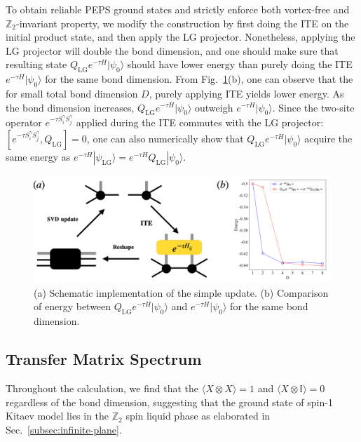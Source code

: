 \documentclass{ntuthesis}
\begin{document}
To obtain reliable PEPS ground states and strictly enforce both vortex-free and $\mathbb{Z}_2$-invariant property, we modify the construction by first doing the ITE on the initial product state, and then apply the LG projector. Nonetheless, applying the LG projector will double the bond dimension, and one should make sure that resulting state $Q_{\text{LG}}e^{-\tau H}|\psi_0 \rangle$ should have lower energy than purely doing the ITE $e^{-\tau H}|\psi_0 \rangle$ for the same bond dimension. From Fig.~\ref{fig:ITE_energy}(b), one can observe that the for small total bond dimension $D$, purely applying ITE yields lower energy. As the bond dimension increases, $Q_{\text{LG}}e^{-\tau H}|\psi_0 \rangle$ outweigh $e^{-\tau H}|\psi_0 \rangle$. Since the two-site operator $e^{-\tau S_i^\gamma S_j^\gamma}$ applied during the ITE commutes with the LG projector: $[e^{-\tau S_i^\gamma S_j^\gamma}, Q_{\text{LG}}] = 0$, one can also numerically show that $Q_{\text{LG}}e^{-\tau H}|\psi_0 \rangle$ acquire the same energy as $e^{-\tau H}|\psi_\text{LG} \rangle = e^{-\tau H}Q_{\text{LG}}|\psi_0 \rangle$.

\begin{figure}[h]
 \centering
\includegraphics[width=\linewidth]{ITE_energy}
\caption{(a) Schematic implementation of the simple update. (b) Comparison of energy between $Q_{\text{LG}}e^{-\tau H}|\psi_0 \rangle$ and $e^{-\tau H}|\psi_0 \rangle$ for the same bond dimension.}
\label{fig:ITE_energy}
\end{figure}

\subsection{Transfer Matrix Spectrum}
Throughout the calculation, we find that the $\langle X \otimes X \rangle = 1$ and $\langle X \otimes \mathbb{I} \rangle = 0$ regardless of the bond dimension, suggesting that the ground state of spin-1 Kitaev model lies in the $\mathbb{Z}_2$ spin liquid phase as elaborated in Sec.~\ref{subsec:infinite-plane}.
\end{document}
